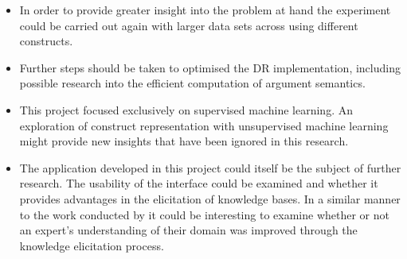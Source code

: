 \begin{itemize}
\item In order to provide greater insight into the problem at hand the experiment could be carried out again with larger data sets across using different constructs.
\item Further steps should be taken to optimised the DR implementation, including possible research into the efficient computation of argument semantics.
\item This project focused exclusively on supervised machine learning. An exploration of construct representation with unsupervised machine learning might provide new insights that have been ignored in this research.
\item The application developed in this project could itself be the subject of further research. The usability of the interface could be examined and whether it provides advantages in the elicitation of knowledge bases. In a similar manner to the work conducted by \cite{twardy2004argument} it could be interesting to examine whether or not an expert's understanding of their domain was improved through the knowledge elicitation process.
\end{itemize}

